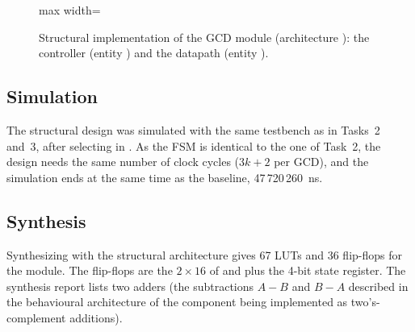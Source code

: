 \begin{figure}[H]
\begin{adjustbox}{max width=\linewidth}
    \end{adjustbox}
    \caption{Structural implementation of the GCD module (architecture ): the controller  (entity ) and the datapath  (entity ).}
    \label{fig:t4_structural}
\end{figure}

\subsection{Simulation}

The structural design was simulated with the same testbench as in Tasks~2 and~3, after selecting  in . As the FSM is identical to the one of Task~2, the design needs the same number of clock cycles ($3k+2$ per GCD), and the simulation ends at the same time as the baseline, 47\,720\,260~ns.

\subsection{Synthesis}


Synthesizing  with the structural architecture gives 67 LUTs and 36 flip-flops for the  module. The flip-flops are the $2\times16$ of  and  plus the 4-bit state register. The synthesis report lists two adders (the subtractions $A-B$ and $B-A$ described in the behavioural architecture of the  component being implemented as two's-complement additions).

